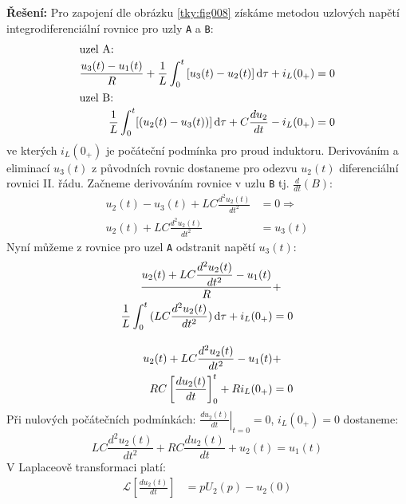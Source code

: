 \begin{mdframed}[style=mdexam]
\begin{example}
    {\centering
      \captionsetup{type=figure}
      \label{tky:fig008}
    \par}
    \noindent\textbf{Řešení:} Pro zapojení dle obrázku \ref{tky:fig008} získáme metodou uzlových
    napětí integrodiferenciální rovnice pro uzly \texttt{A} a \texttt{B}:
    \begin{gather*}
      \begin{align*} %
        \shortintertext{uzel A:}
        \frac{u_3(t)-u_1(t)}{R}+\frac{1}{L}\int_0^t{[u_3(t)-u_2(t)]}\dd{\tau}+i_L(0_+) &= 0  \\
        \shortintertext{uzel B:}
        \frac{1}{L}\int_0^t[(u_2(t)-u_3(t))]\dd{\tau}+C\der{u_2}{t}-i_L(0_+)           &= 0
      \end{align*}
    \end{gather*}
    ve kterých \(i_L(0_+)\) je počáteční podmínka pro proud induktoru. Derivováním a eliminací
    $u_3(t)$ z původních rovnic dostaneme pro odezvu $u_2(t)$ diferenciální rovnici II. řádu.
    Začneme derivováním rovnice v uzlu \texttt{B} tj. \(\frac{d}{dt}(B)\):
    \begin{align*}
      u_2(t)-u_3(t)+LC\frac{d^2u_2(t)}{dt^2} &=0 \Rightarrow   \\
      u_2(t)+LC\frac{d^2u_2(t)}{dt^2}        &=u_3(t)
    \end{align*}
    Nyní můžeme z rovnice pro uzel \texttt{A} odstranit napětí \(u_3(t)\):
    \begin{align*}
      \frac{u_2(t)+LC\dfrac{d^2u_2(t)}{dt^2}-u_1(t)}{R}             &+    \\
      \frac{1}{L}\int_0^t{(LC\frac{d^2u_2(t)}{dt^2})}\mathop{}\!\mathrm{d}\tau+i_L(0_+) &=  0 \\
      \shortintertext{}
      u_2(t)+LC\frac{d^2u_2(t)}{dt^2}-u_1(t)                        &+    \\
      RC\left[\frac{du_2(t)}{dt}\right]_0^t+Ri_L(0_+)               &=  0
    \end{align*}
    Při nulových počátečních podmínkách: $\left.\frac{du_2(t)}{dt}\right\rvert_{t=0}=0$,
    $i_L(0_+)=0$ dostaneme:
    \begin{equation*}
      \boxed{LC\frac{d^2u_2(t)}{dt^2}+RC\frac{du_2(t)}{dt}+u_2(t)=u_1(t)}
    \end{equation*}
    V Laplaceově transformaci platí:
    \begin{align*}
      \mathcal{L}\left[\frac{du_2(t)}{dt}\right]     &= pU_2(p)-u_2(0) \\

\end{align*}
\end{example}
\end{mdframed}
